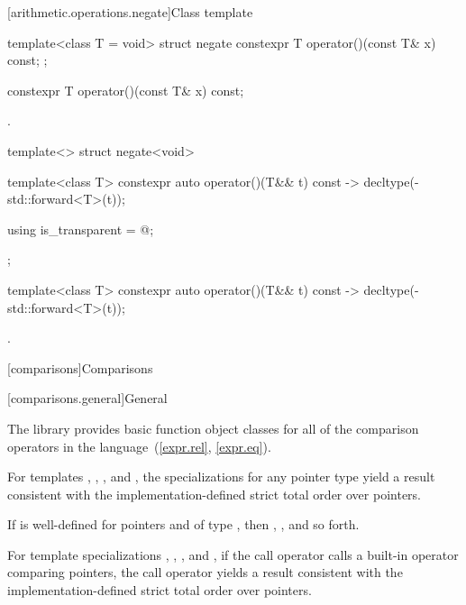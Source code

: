 [arithmetic.operations.negate]{Class template }

%
\begin{itemdecl}
template<class T = void> struct negate {
  constexpr T operator()(const T& x) const;
};
\end{itemdecl}

%
\begin{itemdecl}
constexpr T operator()(const T& x) const;
\end{itemdecl}

\begin{itemdescr}
\pnum
\returns
{}.
\end{itemdescr}

%
\begin{itemdecl}
template<> struct negate<void> {
  template<class T> constexpr auto operator()(T&& t) const
    -> decltype(-std::forward<T>(t));

  using is_transparent = @\unspec@;
};
\end{itemdecl}

%
\begin{itemdecl}
template<class T> constexpr auto operator()(T&& t) const
    -> decltype(-std::forward<T>(t));
\end{itemdecl}

\begin{itemdescr}
\pnum
\returns
{}.
\end{itemdescr}


[comparisons]{Comparisons}

[comparisons.general]{General}

\pnum
The library provides basic function object classes for all of the comparison
operators in the language~(\ref{expr.rel}, \ref{expr.eq}).

\pnum
For templates , , , and
, the specializations for any pointer type
yield a result consistent with the
implementation-defined strict total order over pointers.
\begin{note}
If  is well-defined
for pointers  and  of type ,
then ,
, and so forth.
\end{note}
For template specializations , ,
, and ,
if the call operator calls a built-in operator comparing pointers,
the call operator yields a result consistent
with the implementation-defined strict total order over pointers.

